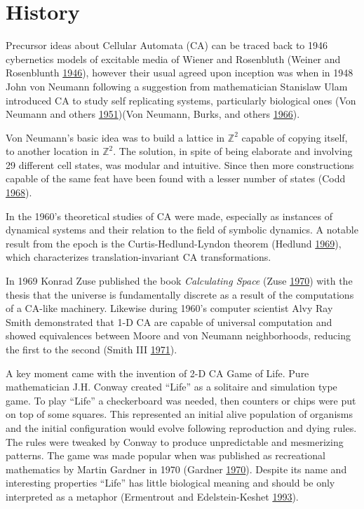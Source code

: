 \documentclass[
]{book}
\begin{document}
\hypertarget{history}{%
\section{History}\label{history}}

Precursor ideas about Cellular Automata (CA) can be traced back to 1946 cybernetics models of excitable media of Wiener and Rosenbluth (Weiner and Rosenblunth \protect\hyperlink{ref-weiner1946mathematical}{1946}), however their usual agreed upon inception was when in 1948 John von Neumann following a suggestion from mathematician Stanislaw Ulam introduced CA to study self replicating systems, particularly biological ones (Von Neumann and others \protect\hyperlink{ref-von1951general}{1951})(Von Neumann, Burks, and others \protect\hyperlink{ref-von1966theory}{1966}).

Von Neumann's basic idea was to build a lattice in \(\mathds{Z}^2\) capable of copying itself, to another location in \(\mathds{Z}^2\). The solution, in spite of being elaborate and involving 29 different cell states, was modular and intuitive. Since then more constructions capable of the same feat have been found with a lesser number of states (Codd \protect\hyperlink{ref-codd1968cellular}{1968}).

In the 1960's theoretical studies of CA were made, especially as instances of dynamical systems and their relation to the field of symbolic dynamics. A notable result from the epoch is the Curtis-Hedlund-Lyndon theorem (Hedlund \protect\hyperlink{ref-hedlund1969endomorphisms}{1969}), which characterizes translation-invariant CA transformations.

In 1969 Konrad Zuse published the book \emph{Calculating Space} (Zuse \protect\hyperlink{ref-zuse1970calculating}{1970}) with the thesis that the universe is fundamentally discrete as a result of the computations of a CA-like machinery. Likewise during 1960's computer scientist Alvy Ray Smith demonstrated that 1-D CA are capable of universal computation and showed equivalences between Moore and von Neumann neighborhoods, reducing the first to the second (Smith III \protect\hyperlink{ref-smith1971simple}{1971}).

A key moment came with the invention of 2-D CA Game of Life. Pure mathematician J.H. Conway created ``Life'' as a solitaire and simulation type game. To play ``Life'' a checkerboard was needed, then counters or chips were put on top of some squares. This represented an initial alive population of organisms and the initial configuration would evolve following reproduction and dying rules. The rules were tweaked by Conway to produce unpredictable and mesmerizing patterns. The game was made popular when was published as recreational mathematics by Martin Gardner in 1970 (Gardner \protect\hyperlink{ref-gardner1970mathematical}{1970}). Despite its name and interesting properties ``Life'' has little biological meaning and should be only interpreted as a metaphor (Ermentrout and Edelstein-Keshet \protect\hyperlink{ref-ermentrout1993cellular}{1993}).
\end{document}
